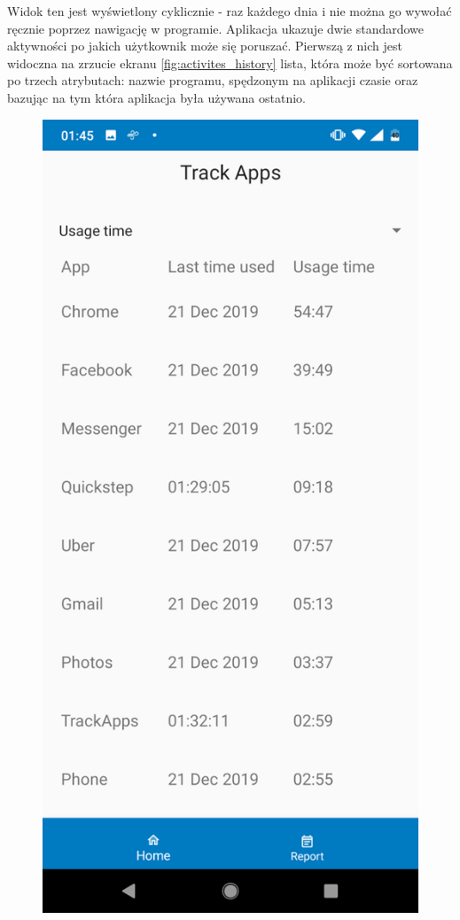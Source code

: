 \documentclass[a4paper,twoside,12pt]{book}
\begin{document}
\begin{description}
Widok ten jest wyświetlony cyklicznie - raz każdego dnia i nie można go wywołać ręcznie poprzez nawigację w programie. Aplikacja ukazuje dwie standardowe aktywności po jakich użytkownik może się poruszać. Pierwszą z nich jest widoczna na zrzucie ekranu \ref{fig:activites_history} lista, która może być sortowana po trzech atrybutach: nazwie programu, spędzonym na aplikacji czasie oraz bazując na tym która aplikacja była używana ostatnio. 
\begin{figure}[h!]
    \centering
    \includegraphics[scale=0.1]{images/activites_history.png}

\end{figure}
\end{description}
\end{document}
